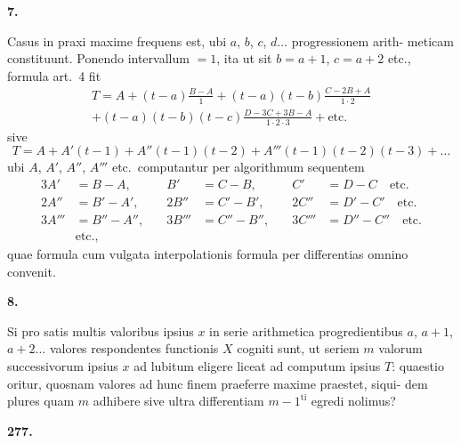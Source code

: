 \documentclass[12pt,a4paper]{article}
\begin{document}
\smallskip\noindent
\textbf{7.}

\smallskip\noindent
Casus in praxi maxime frequens est, ubi $a$, $b$, $c$, $d\dots$ progressionem arith-
meticam constituunt. Ponendo intervallum $=1$, ita ut sit $b=a+1$, $c=a+2$
etc., formula art.\ 4 fit
\begin{multline*}
T = A + (t-a)\frac{B-A}{1} + (t-a)(t-b)\frac{C-2B+A}{1\cdot 2}\\
+ (t-a)(t-b)(t-c)\frac{D-3C+3B-A}{1\cdot 2\cdot 3} + \text{etc.}
\end{multline*}
sive
\begin{equation*}
T = A + A'(t-1) + A''(t-1)(t-2) + A'''(t-1)(t-2)(t-3) + \dots
\end{equation*}
ubi $A$, $A'$, $A''$, $A'''$ etc.\ computantur per algorithmum sequentem
\begin{alignat*}{3}
A' &= B-A, &\quad B' &= C-B, &\quad C' &= D-C \quad \text{etc.}\\
2A'' &= B'-A', &\quad 2B'' &= C'-B', &\quad 2C'' &= D'-C' \quad \text{etc.}\\
3A''' &= B''-A'', &\quad 3B''' &= C''-B'', &\quad 3C''' &= D''-C'' \quad \text{etc.}\\
&\text{etc.,}
\end{alignat*}
quae formula cum vulgata interpolationis formula per differentias omnino
convenit.

\smallskip\noindent
\textbf{8.}

\smallskip\noindent
Si pro satis multis valoribus ipsius $x$ in serie arithmetica progredientibus
$a$, $a+1$, $a+2\dots$ valores respondentes functionis $X$ cogniti sunt, ut seriem $m$
valorum successivorum ipsius $x$ ad lubitum eligere liceat ad computum ipsius $T$:
quaestio oritur, quosnam valores ad hunc finem praeferre maxime praestet, siqui-
dem plures quam $m$ adhibere sive ultra differentiam $m-1^{\mathrm{ti}}$ egredi nolimus?

\newpage
\noindent\textbf{277.}
\end{document}
